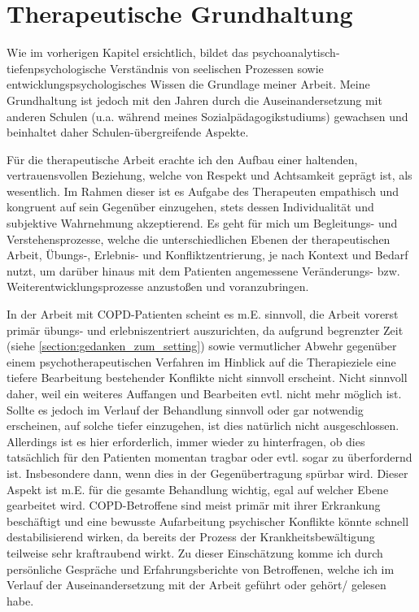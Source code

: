 \section{Therapeutische Grundhaltung} 
Wie im vorherigen Kapitel ersichtlich, bildet das psychoanalytisch-tiefenpsychologische Verständnis von seelischen Prozessen sowie entwicklungspsychologisches Wissen die Grundlage meiner Arbeit. Meine Grundhaltung ist jedoch mit den Jahren durch die Auseinandersetzung mit anderen Schulen (u.a. während meines Sozialpädagogikstudiums) gewachsen und beinhaltet daher Schulen-übergreifende Aspekte. 

Für die therapeutische Arbeit erachte ich den Aufbau einer haltenden, vertrauensvollen Beziehung, welche von Respekt und Achtsamkeit geprägt ist, als wesentlich. 
Im Rahmen dieser ist es Aufgabe des Therapeuten empathisch und kongruent auf sein Gegenüber einzugehen, stets dessen Individualität und subjektive Wahrnehmung akzeptierend. 
Es geht für mich um Begleitungs- und Verstehensprozesse, welche die unterschiedlichen Ebenen der therapeutischen Arbeit, Übungs-, Erlebnis- und Konfliktzentrierung, je nach Kontext und Bedarf nutzt, um darüber hinaus mit dem Patienten angemessene Veränderungs- bzw. Weiterentwicklungsprozesse anzustoßen und voranzubringen. 

In der Arbeit mit COPD-Patienten scheint es m.E. sinnvoll, die Arbeit vorerst primär übungs- und erlebniszentriert auszurichten, da aufgrund begrenzter Zeit (siehe \ref{section:gedanken_zum_setting}) sowie vermutlicher Abwehr gegenüber einem psychotherapeutischen Verfahren im Hinblick auf die Therapieziele eine tiefere Bearbeitung bestehender Konflikte nicht sinnvoll erscheint. Nicht sinnvoll daher, weil ein weiteres Auffangen und Bearbeiten evtl. nicht mehr möglich ist. Sollte es jedoch im Verlauf der Behandlung sinnvoll oder gar notwendig erscheinen, auf solche tiefer einzugehen, ist dies natürlich nicht ausgeschlossen. Allerdings ist es hier erforderlich, immer wieder zu hinterfragen, ob dies tatsächlich für den Patienten momentan tragbar oder evtl. sogar zu überfordernd ist. Insbesondere dann, wenn dies in der Gegenübertragung spürbar wird. Dieser Aspekt ist m.E. für die gesamte Behandlung wichtig, egal auf welcher Ebene gearbeitet wird. COPD-Betroffene sind meist primär mit ihrer Erkrankung beschäftigt und eine bewusste Aufarbeitung psychischer Konflikte könnte schnell destabilisierend wirken, da bereits der Prozess der Krankheitsbewältigung teilweise sehr kraftraubend wirkt. Zu dieser Einschätzung komme ich durch persönliche Gespräche und Erfahrungsberichte von Betroffenen, welche ich im Verlauf der Auseinandersetzung mit der Arbeit geführt oder gehört/ gelesen habe. 


